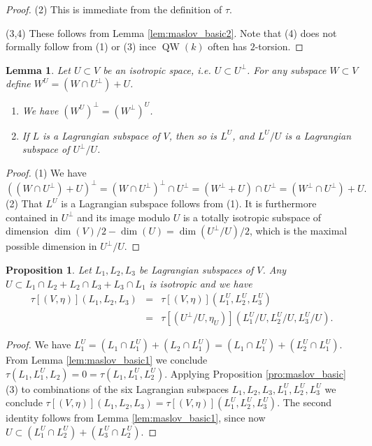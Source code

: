 \documentclass{article}
\newtheorem{lem}[thm]{Lemma}
\newtheorem{pro}[thm]{Proposition}
\theoremstyle{definition}
\numberwithin{equation}{subsection}
\renewcommand{\-}{\hyp{}}
\DeclareMathOperator{\QW}{QW}
\begin{document}
\begin{appendices}
\begin{proof}
	(2) This is immediate from the definition of $\tau$.

	(3,4) These follows from Lemma \ref{lem:maslov_basic2}. Note that (4) does not formally follow from (1) or (3) ince $\QW(k)$ often has $2$-torsion.	
\end{proof}

\begin{lem}
	Let $U \subset V$ be an isotropic space, i.e. $U \subset U^\perp$. For any subspace $W \subset V$ define $W^U=(W \cap U^\perp)+U$. 
	\begin{enumerate}
		\item We have $(W^U)^\perp = (W^\perp)^U$.
		\item If $L$ is a Lagrangian subspace of $V$, then so is $L^U$, and $L^U/U$ is a Lagrangian subspace of $U^\perp/U$.
	\end{enumerate}
	
\end{lem}
\begin{proof}
	(1) We have 
	\[ ((W\cap U^\perp)+U)^\perp=(W \cap U^\perp)^\perp \cap U^\perp=(W^\perp+U)\cap U^\perp = (W^\perp \cap U^\perp) + U. \]
	(2) That $L^U$ is a Lagrangian subspace follows from (1). It is furthermore contained in $U^\perp$ and its image modulo $U$ is a totally isotropic subspace of dimension $\dim(V)/2-\dim(U)=\dim(U^\perp/U)/2$, which is the maximal possible dimension in $U^\perp/U$.
\end{proof}

\begin{pro} Let $L_1,L_2,L_3$ be Lagrangian subspaces of $V$. Any $U \subset L_1 \cap L_2 + L_2 \cap L_3 + L_3 \cap L_1$ is isotropic and we have 
	\begin{eqnarray*}
		\tau[(V,\eta)](L_1,L_2,L_3)&=&\tau[(V,\eta)](L_1^U,L_2^U,L_3^U)\\
		&=&\tau[(U^\perp/U,\eta_U)](L_1^U/U,L_2^U/U,L_3^U/U).
	\end{eqnarray*}
\end{pro}
\begin{proof}
	We have $L_1^U=(L_1 \cap L_1^U)+(L_2 \cap L_1^U)=(L_1 \cap L_1^U) + (L_2^U \cap L_1^U)$. From Lemma \ref{lem:maslov_basic1} we conclude $\tau(L_1,L_1^U,L_2)=0=\tau(L_1,L_1^U,L_2^U)$. Applying Proposition \ref{pro:maslov_basic}(3) to combinations of the six Lagrangian subspaces $L_1,L_2,L_3,L_1^U,L_2^U,L_3^U$ we conclude $\tau[(V,\eta)](L_1,L_2,L_3)=\tau[(V,\eta)](L_1^U,L_2^U,L_3^U)$. The second identity follows from Lemma \ref{lem:maslov_basic1}, since now $U \subset (L_1^U \cap L_2^U) + (L_3^U \cap L_2^U)$.
\end{proof}


\end{appendices}
\end{document}
